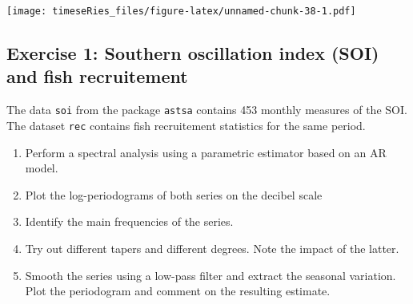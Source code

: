 \documentclass[]{book}
\newenvironment{Shaded}{\begin{snugshade}}{\end{snugshade}}
\newcommand{\KeywordTok}[1]{\textcolor[rgb]{0.13,0.29,0.53}{\textbf{#1}}}
\newcommand{\DataTypeTok}[1]{\textcolor[rgb]{0.13,0.29,0.53}{#1}}
\newcommand{\DecValTok}[1]{\textcolor[rgb]{0.00,0.00,0.81}{#1}}
\newcommand{\FloatTok}[1]{\textcolor[rgb]{0.00,0.00,0.81}{#1}}
\newcommand{\CharTok}[1]{\textcolor[rgb]{0.31,0.60,0.02}{#1}}
\newcommand{\StringTok}[1]{\textcolor[rgb]{0.31,0.60,0.02}{#1}}
\newcommand{\CommentTok}[1]{\textcolor[rgb]{0.56,0.35,0.01}{\textit{#1}}}
\newcommand{\OperatorTok}[1]{\textcolor[rgb]{0.81,0.36,0.00}{\textbf{#1}}}
\newcommand{\NormalTok}[1]{#1}
\providecommand{\tightlist}{%
  \setlength{\itemsep}{0pt}\setlength{\parskip}{0pt}}
\begin{document}
\begin{Shaded}
\end{Shaded}

\texttt{[image: timeseRies\_files/figure-latex/unnamed-chunk-38-1.pdf]}

\subsection{Exercise 1: Southern oscillation index (SOI) and fish
recruitement}\label{exercise-1-southern-oscillation-index-soi-and-fish-recruitement}

The data \texttt{soi} from the package \texttt{astsa} contains 453
monthly measures of the SOI. The dataset \texttt{rec} contains fish
recruitement statistics for the same period.

\begin{enumerate}
\def\labelenumi{\arabic{enumi}.}
\tightlist
\item
  Perform a spectral analysis using a parametric estimator based on an
  AR model.
\item
  Plot the log-periodograms of both series on the decibel scale
\item
  Identify the main frequencies of the series.
\item
  Try out different tapers and different degrees. Note the impact of the
  latter.
\item
  Smooth the series using a low-pass filter and extract the seasonal
  variation. Plot the periodogram and comment on the resulting estimate.
\end{enumerate}
\end{document}
